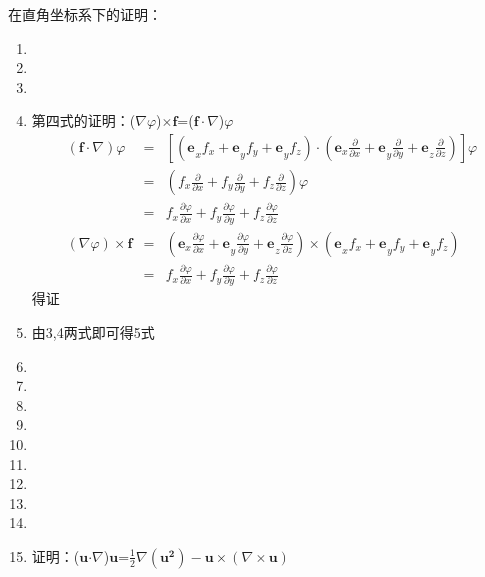 \documentclass[UTF8]{ctexart}
\newcommand{\tmmathbf}[1]{\ensuremath{\boldsymbol{#1}}}
\newcommand{\tmtextbf}[1]{{\bfseries{#1}}}
\newenvironment{enumeratenumeric}{\begin{enumerate}[1.] }{\end{enumerate}}
\begin{document}
在直角坐标系下的证明：
\begin{enumeratenumeric}
  \item
  
  \item
  
  \item
  
  \item  第四式的证明：($\nabla \varphi$)$\times
  \tmmathbf{f}$=(\tmtextbf{$\tmmathbf{f \cdot}$}$\nabla$)$\varphi$
  \begin{eqnarray*}
    (\tmmathbf{f} \cdot \nabla) \varphi & = & \left[ (\tmmathbf{e_{}}_x f_x +
    \tmmathbf{e_{}}_y f_y + \tmmathbf{e_{}}_y f_z) \cdot \left( \tmmathbf{e}_x
    \tmmathbf{} \frac{\partial}{\partial x} + \tmmathbf{e_{}}_y
    \frac{\partial}{\partial y} + \tmmathbf{e_{}}_z \frac{\partial}{\partial
    z} \right) \right] \varphi\\
    & = & \left( f_x \tmmathbf{} \tmmathbf{} \frac{\partial}{\partial x} +
    f_y \frac{\partial}{\partial y} + f_z \frac{\partial}{\partial z} \right)
    \varphi\\
    & = & f_x \tmmathbf{} \tmmathbf{} \frac{\partial \varphi}{\partial x} +
    f_y \frac{\partial \varphi}{\partial y} + f_z \frac{\partial
    \varphi}{\partial z}\\
    (\nabla \varphi) \times \tmmathbf{f} & = & \left( \tmmathbf{e}_x
    \tmmathbf{} \frac{\partial \varphi}{\partial x} + \tmmathbf{e_{}}_y
    \frac{\partial \varphi}{\partial y} + \tmmathbf{e_{}}_z \frac{\partial
    \varphi}{\partial z} \right) \times (\tmmathbf{e_{}}_x f_x +
    \tmmathbf{e_{}}_y f_y + \tmmathbf{e_{}}_y f_z)\\
    & = & f_x \tmmathbf{} \tmmathbf{} \frac{\partial \varphi}{\partial x} +
    f_y \frac{\partial \varphi}{\partial y} + f_z \frac{\partial
    \varphi}{\partial z}
  \end{eqnarray*}
  得证
  
  \item 由3,4两式即可得5式
  
  \item
  
  \item
  
  \item
  
  \item
  
  \item
  
  \item
  
  \item
  
  \item
  
  \item
  
  \item 证明：(\tmtextbf{$\tmmathbf{u}
  \tmmathbf{\cdot}$}$\nabla$)$\tmmathbf{u}$=$\frac{1}{2} \nabla
  (\tmmathbf{u^2}) - \tmmathbf{u \times} (\nabla \times \tmmathbf{u})$
\end{enumeratenumeric}
\end{document}
